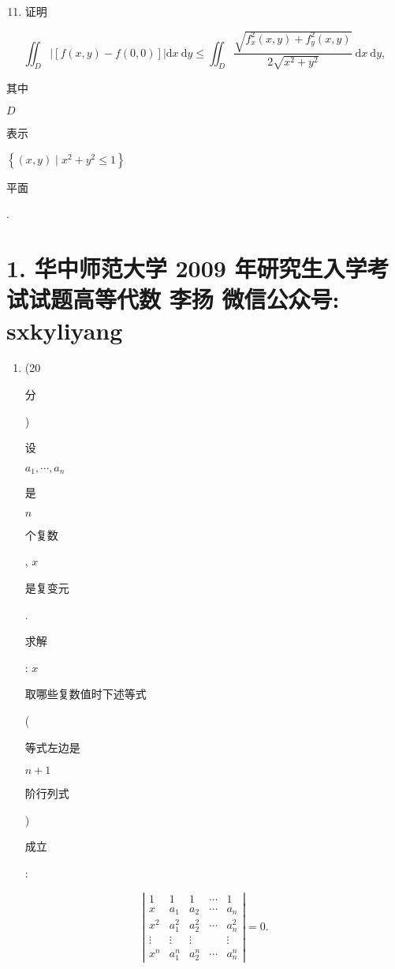 \documentclass[10pt]{article}
\begin{document}
\begin{enumerate}
  \setcounter{enumi}{10}
  \item \begin{CJK}{UTF8}{mj}证明\end{CJK}
\end{enumerate}
$$
\iint_{D}|[f(x, y)-f(0,0)]| \mathrm{d} x \mathrm{~d} y \leq \iint_{D} \frac{\sqrt{f_{x}^{2}(x, y)+f_{y}^{2}(x, y)}}{2 \sqrt{x^{2}+y^{2}}} \mathrm{~d} x \mathrm{~d} y,
$$
\begin{CJK}{UTF8}{mj}其中\end{CJK} $D$ \begin{CJK}{UTF8}{mj}表示\end{CJK} $\left\{(x, y) \mid x^{2}+y^{2} \leq 1\right\}$ \begin{CJK}{UTF8}{mj}平面\end{CJK}.

\section{1. 华中师范大学 2009 年研究生入学考试试题高等代数 
 李扬 
 微信公众号: sxkyliyang}
\begin{enumerate}
  \item (20 \begin{CJK}{UTF8}{mj}分\end{CJK}) \begin{CJK}{UTF8}{mj}设\end{CJK} $a_{1}, \cdots, a_{n}$ \begin{CJK}{UTF8}{mj}是\end{CJK} $n$ \begin{CJK}{UTF8}{mj}个复数\end{CJK}, $x$ \begin{CJK}{UTF8}{mj}是复变元\end{CJK}. \begin{CJK}{UTF8}{mj}求解\end{CJK}: $x$ \begin{CJK}{UTF8}{mj}取哪些复数值时下述等式\end{CJK} (\begin{CJK}{UTF8}{mj}等式左边是\end{CJK} $n+1$ \begin{CJK}{UTF8}{mj}阶行列式\end{CJK}) \begin{CJK}{UTF8}{mj}成立\end{CJK}:
\end{enumerate}
$$
\left|\begin{array}{ccccc}
1 & 1 & 1 & \cdots & 1 \\
x & a_{1} & a_{2} & \cdots & a_{n} \\
x^{2} & a_{1}^{2} & a_{2}^{2} & \cdots & a_{n}^{2} \\
\vdots & \vdots & \vdots & & \vdots \\
x^{n} & a_{1}^{n} & a_{2}^{n} & \cdots & a_{n}^{n}
\end{array}\right|=0 .
$$
\end{document}
